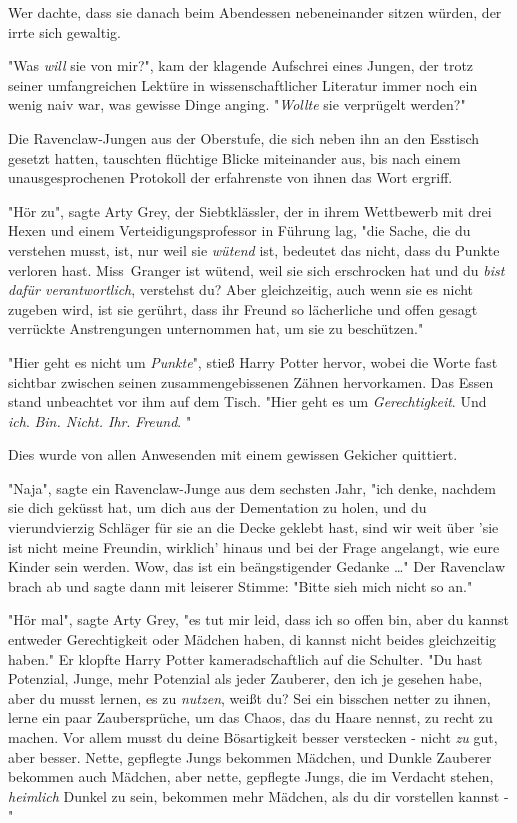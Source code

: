 {Wer dachte, dass sie danach beim Abendessen nebeneinander sitzen würden, der irrte sich gewaltig.

"Was \emph{will} sie von mir?", kam der klagende Aufschrei eines Jungen, der trotz seiner umfangreichen Lektüre in wissenschaftlicher Literatur immer noch ein wenig naiv war, was gewisse Dinge anging. "\emph{Wollte} sie verprügelt werden?"

Die Ravenclaw-Jungen aus der Oberstufe, die sich neben ihn an den Esstisch gesetzt hatten, tauschten flüchtige Blicke miteinander aus, bis nach einem unausgesprochenen Protokoll der erfahrenste von ihnen das Wort ergriff.

"Hör zu", sagte Arty Grey, der Siebtklässler, der in ihrem Wettbewerb mit drei Hexen und einem Verteidigungsprofessor in Führung lag, "die Sache, die du verstehen musst, ist, nur weil sie \emph{wütend} ist, bedeutet das nicht, dass du Punkte verloren hast. Miss~Granger ist wütend, weil sie sich erschrocken hat und du \emph{bist dafür verantwortlich}, verstehst du? Aber gleichzeitig, auch wenn sie es nicht zugeben wird, ist sie gerührt, dass ihr Freund so lächerliche und offen gesagt verrückte Anstrengungen unternommen hat, um sie zu beschützen."

"Hier geht es nicht um \emph{Punkte}", stieß Harry Potter hervor, wobei die Worte fast sichtbar zwischen seinen zusammengebissenen Zähnen hervorkamen. Das Essen stand unbeachtet vor ihm auf dem Tisch. "Hier geht es um \emph{Gerechtigkeit}. Und \emph{ich}. \emph{Bin. Nicht. Ihr}. \emph{Freund}. "

Dies wurde von allen Anwesenden mit einem gewissen Gekicher quittiert.

"Naja", sagte ein Ravenclaw-Junge aus dem sechsten Jahr, "ich denke, nachdem sie dich geküsst hat, um dich aus der Dementation zu holen, und du vierundvierzig Schläger für sie an die Decke geklebt hast, sind wir weit über 'sie ist nicht meine Freundin, wirklich' hinaus und bei der Frage angelangt, wie eure Kinder sein werden. Wow, das ist ein beängstigender Gedanke …" Der Ravenclaw brach ab und sagte dann mit leiserer Stimme: "Bitte sieh mich nicht so an."

"Hör mal", sagte Arty Grey, "es tut mir leid, dass ich so offen bin, aber du kannst entweder Gerechtigkeit oder Mädchen haben, di kannst nicht beides gleichzeitig haben." Er klopfte Harry Potter kameradschaftlich auf die Schulter. "Du hast Potenzial, Junge, mehr Potenzial als jeder Zauberer, den ich je gesehen habe, aber du musst lernen, es zu \emph{nutzen}, weißt du? Sei ein bisschen netter zu ihnen, lerne ein paar Zaubersprüche, um das Chaos, das du Haare nennst, zu recht zu machen. Vor allem musst du deine Bösartigkeit besser verstecken - nicht \emph{zu} gut, aber besser. Nette, gepflegte Jungs bekommen Mädchen, und Dunkle Zauberer bekommen auch Mädchen, aber nette, gepflegte Jungs, die im Verdacht stehen, \emph{heimlich} Dunkel zu sein, bekommen mehr Mädchen, als du dir vorstellen kannst -"

}
